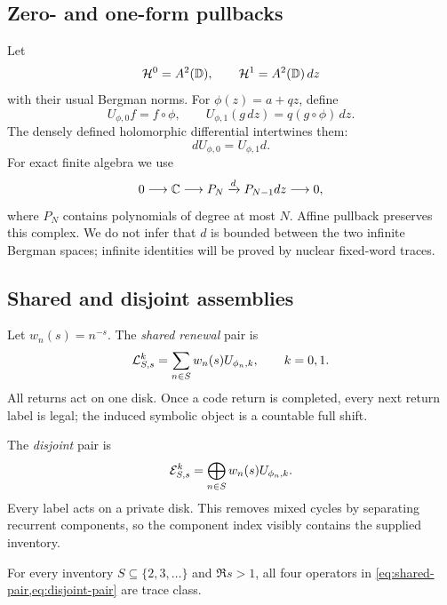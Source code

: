 \subsection{Zero- and one-form pullbacks}

Let
\[
 \mathcal H^0=A^2(\mathbb D),\qquad \mathcal H^1=A^2(\mathbb D)\,dz
\]
with their usual Bergman norms.  For \(\phi(z)=a+qz\), define
\begin{equation}
 U_{\phi,0}f=f\circ\phi,
 \qquad
 U_{\phi,1}(g\,dz)=q(g\circ\phi)\,dz.
 \label{eq:form-pullbacks}
\end{equation}
The densely defined holomorphic differential intertwines them:
\[
        dU_{\phi,0}=U_{\phi,1}d.
\]
For exact finite algebra we use
\begin{equation}
 0\longrightarrow\mathbb C\longrightarrow P_N
 \xrightarrow{d}P_{N-1}dz\longrightarrow0,
 \label{eq:polynomial-complex}
\end{equation}
where \(P_N\) contains polynomials of degree at most \(N\).  Affine
pullback preserves this complex.  We do not infer that \(d\) is bounded
between the two infinite Bergman spaces; infinite identities will be proved
by nuclear fixed-word traces.

\subsection{Shared and disjoint assemblies}

Let \(w_n(s)=n^{-s}\).  The \emph{shared renewal} pair is
\begin{equation}
 \mathcal L^k_{S,s}=\sum_{n\in S}w_n(s)U_{\phi_n,k},
 \qquad k=0,1.
 \label{eq:shared-pair}
\end{equation}
All returns act on one disk.  Once a code return is completed, every next
return label is legal; the induced symbolic object is a countable full
shift.

The \emph{disjoint} pair is
\begin{equation}
 \mathcal E^k_{S,s}=\bigoplus_{n\in S}w_n(s)U_{\phi_n,k}.
 \label{eq:disjoint-pair}
\end{equation}
Every label acts on a private disk.  This removes mixed cycles by separating
recurrent components, so the component index visibly contains the supplied
inventory.

\begin{proposition}
\label{prop:trace-class}
For every inventory \(S\subseteq\{2,3,\ldots\}\) and \(\Re s>1\), all four
operators in \cref{eq:shared-pair,eq:disjoint-pair} are trace class.
\end{proposition}

